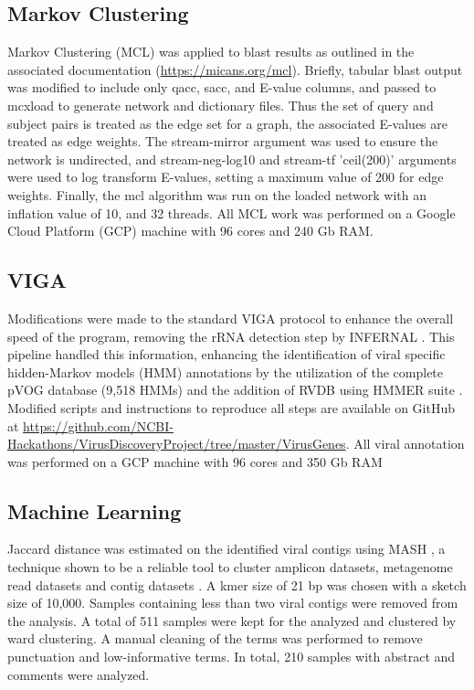   \subsection{Markov Clustering}
  Markov Clustering (MCL) \cite{Enright2002} was applied to blast results as
  outlined in the associated documentation (\url{https://micans.org/mcl}).
  Briefly, tabular blast output was modified to include only qacc, sacc, and
  E-value columns, and passed to mcxload to generate network and dictionary
  files. Thus the set of query and subject pairs is treated as the edge set for
  a graph, the associated E-values are treated as edge weights. The
  stream-mirror argument was used to ensure the network is undirected, and
  stream-neg-log10  and stream-tf 'ceil(200)' arguments were used to log
  transform E-values, setting a maximum value of 200 for edge weights. Finally,
  the mcl algorithm was run on the loaded network with an inflation value of
  10, and 32 threads. All MCL work was performed on a Google Cloud Platform
  (GCP) machine with 96 cores and 240 Gb RAM.

  \subsection{VIGA}
  Modifications were made to the standard VIGA \cite{Gonzalez-Tortuero2018}
  protocol to enhance the overall speed of the program, removing the rRNA
  detection step by INFERNAL \cite{Nawrocki2013}. This pipeline handled this
  information, enhancing the identification of viral specific hidden-Markov
  models (HMM) annotations by the utilization of the complete pVOG database
  \cite{Grazziotin2017} (9,518 HMMs) and the addition of RVDB
  \cite{Goodacre2018} using HMMER suite \cite{hmmer}. Modified scripts and
  instructions to reproduce all steps are available on GitHub at
  \url{https://github.com/NCBI-Hackathons/VirusDiscoveryProject/tree/master/VirusGenes}.
  All viral annotation was performed on a GCP machine with 96 cores and 350 Gb
  RAM

  \subsection{Machine Learning}
  Jaccard distance was estimated on the identified viral contigs using MASH
  \cite{Ondov2019}, a technique shown to be a reliable tool to cluster amplicon
  datasets, metagenome read datasets and contig datasets \cite{Choi2018}. A
  kmer size of 21 bp was chosen with a sketch size of 10,000. Samples
  containing less than two viral contigs were removed from the analysis. A
  total of 511 samples were kept for the analyzed and clustered by ward
  clustering. A manual cleaning of the terms was performed to remove
  punctuation and low-informative terms. In total, 210 samples with abstract
  and comments were analyzed.
